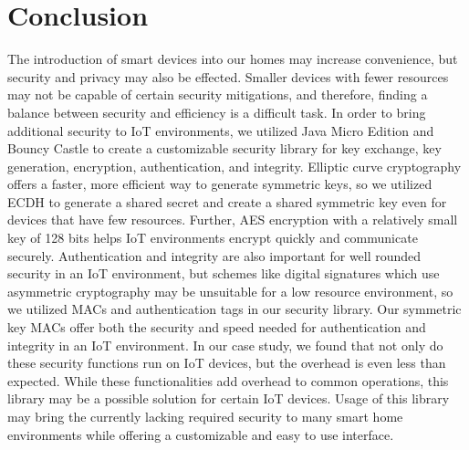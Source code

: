 \section{Conclusion}
The introduction of smart devices into our homes may increase convenience, but security and privacy may also be effected. 
Smaller devices with fewer resources may not be capable of certain security mitigations,
and therefore, finding a balance between security and efficiency is a difficult task. 
In order to bring additional security to IoT environments,
we utilized Java Micro Edition and Bouncy Castle to create a customizable security library for key exchange, key generation, encryption, authentication, and integrity. 
Elliptic curve cryptography offers a faster, more efficient way to generate symmetric keys, %
so we utilized ECDH to generate a shared secret and create a shared symmetric key even for devices that have few resources. 
Further, AES encryption with a relatively small key of 128 bits helps IoT environments encrypt quickly and communicate securely. 
Authentication and integrity are also important for well rounded security in an IoT environment,
but schemes like digital signatures which use asymmetric cryptography may be unsuitable for a low resource environment,
so we utilized MACs and authentication tags in our security library. 
Our symmetric key MACs offer both the security and speed needed for authentication and integrity in an IoT environment.  
In our case study, we found that not only do these security functions run on IoT devices, but the overhead is even less than expected. 
While these functionalities add overhead to common operations,
this library may be a possible solution for certain IoT devices. 
Usage of this library may bring the currently lacking required security to many smart home environments while offering a customizable and easy to use interface. 
